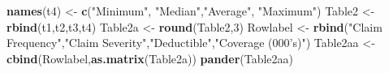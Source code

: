 \documentclass[]{book}
\newenvironment{Shaded}{\begin{snugshade}}{\end{snugshade}}
\newcommand{\KeywordTok}[1]{\textcolor[rgb]{0.13,0.29,0.53}{\textbf{#1}}}
\newcommand{\DecValTok}[1]{\textcolor[rgb]{0.00,0.00,0.81}{#1}}
\newcommand{\StringTok}[1]{\textcolor[rgb]{0.31,0.60,0.02}{#1}}
\newcommand{\NormalTok}[1]{#1}
\theoremstyle{definition}
\theoremstyle{definition}
\theoremstyle{definition}
\theoremstyle{remark}
\begin{document}
\begin{Shaded}
\begin{Highlighting}[]
\KeywordTok{names}\NormalTok{(t4) <-}\StringTok{ }\KeywordTok{c}\NormalTok{(}\StringTok{"Minimum"}\NormalTok{, }\StringTok{"Median"}\NormalTok{,}\StringTok{"Average"}\NormalTok{, }\StringTok{"Maximum"}\NormalTok{)}
\NormalTok{Table2 <-}\StringTok{ }\KeywordTok{rbind}\NormalTok{(t1,t2,t3,t4)}
\NormalTok{Table2a <-}\StringTok{ }\KeywordTok{round}\NormalTok{(Table2,}\DecValTok{3}\NormalTok{)}
\NormalTok{Rowlabel <-}\StringTok{ }\KeywordTok{rbind}\NormalTok{(}\StringTok{"Claim Frequency"}\NormalTok{,}\StringTok{"Claim Severity"}\NormalTok{,}\StringTok{"Deductible"}\NormalTok{,}\StringTok{"Coverage (000's)"}\NormalTok{)}
\NormalTok{Table2aa <-}\StringTok{ }\KeywordTok{cbind}\NormalTok{(Rowlabel,}\KeywordTok{as.matrix}\NormalTok{(Table2a))}
\KeywordTok{pander}\NormalTok{(Table2aa)}
\end{Highlighting}
\end{Shaded}
\end{document}
